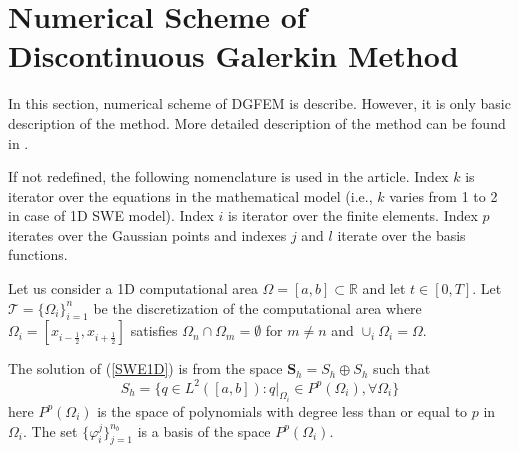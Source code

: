 \section{Numerical Scheme of Discontinuous Galerkin Method}\label{NS}
In this section, numerical scheme of DGFEM is describe. However, it is only basic description of the method. More detailed description of the method can be found in \cite{reed1973}. 

If not redefined, the following nomenclature is used in the article. Index $k$ is iterator over the equations in the mathematical model (i.e., $k$ varies from 1 to 2 in case of 1D SWE model). Index $i$ is iterator over the finite elements. Index $p$ iterates over the Gaussian points and indexes $j$ and $l$ iterate over the basis functions.

Let us consider a 1D computational area $\Omega=[a,b] \subset \mathbb{R}$ and let $t\in[0,T]$. Let $\mathcal{T}=\lbrace \Omega_i \rbrace_{i=1}^n$ be the discretization of the computational area where $\Omega_i=[x_{i-\frac12},x_{i+\frac12}]$ satisfies $\Omega_n \cap \Omega_m=\emptyset$ for $m\neq n$ and $\cup_{i}\Omega_i=\Omega$.

The solution of (\ref{SWE1D}) is from the space $\mathbf{S}_h=S_h\oplus S_h$ such that
\begin{equation}
S_h=\lbrace q \in L^2([a,b]):q|_{\Omega_i}\in P^p(\Omega_i),\forall \Omega_i\rbrace
\end{equation}
  here $P^p(\Omega_i)$ is the space of polynomials with degree less than or equal to $p$ in $\Omega_i$. The set $\lbrace \varphi_i^j \rbrace_{j=1}^{n_b}$ is a basis of the space $P^p(\Omega_i)$.

